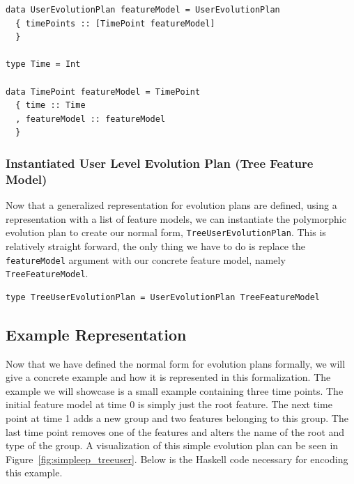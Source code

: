 \documentclass[a4paper,english]{ifimaster}
\begin{document}
\begin{verbatim}
data UserEvolutionPlan featureModel = UserEvolutionPlan
  { timePoints :: [TimePoint featureModel]
  }

type Time = Int

data TimePoint featureModel = TimePoint
  { time :: Time
  , featureModel :: featureModel
  }
\end{verbatim}

\subsubsection*{Instantiated User Level Evolution Plan (Tree Feature Model)}%
\label{ssub:instantiated_user_level_evolution_plan_tree_feature_model_}

Now that a generalized representation for evolution plans are defined, using a representation with a list of feature models, we can instantiate the polymorphic evolution plan to create our normal form, \texttt{TreeUserEvolutionPlan}. This is relatively straight forward, the only thing we have to do is replace the \texttt{featureModel} argument with our concrete feature model, namely \texttt{TreeFeatureModel}.

\begin{verbatim}
type TreeUserEvolutionPlan = UserEvolutionPlan TreeFeatureModel
\end{verbatim}

\subsection{Example Representation}%
\label{sub:example_representation}

Now that we have defined the normal form for evolution plans formally, we will give a concrete example and how it is represented in this formalization. The example we will showcase is a small example containing three time points. The initial feature model at time 0 is simply just the root feature. The next time point at time 1 adds a new group and two features belonging to this group. The last time point removes one of the features and alters the name of the root and type of the group. A visualization of this simple evolution plan can be seen in Figure~\vref{fig:simpleep_treeuser}. Below is the Haskell code necessary for encoding this example.
\end{document}
